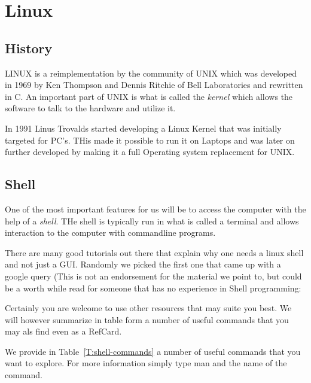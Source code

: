 

\chapter{Linux}
\label{C:linux}

\FILENAME

\section{History}

LINUX is a reimplementation by the community of UNIX which was
developed in 1969 by Ken Thompson and Dennis Ritchie of Bell
Laboratories and rewritten in C. An important part of UNIX is what is
called the \textit{kernel} which allows the software to talk to
the hardware and utilize it. 

In 1991 Linus Trovalds started developing a Linux Kernel that was
initially targeted for PC's. THis made it possible to run it on
Laptops and was later on further developed by making it a full
Operating system replacement for UNIX. 

\section{Shell}

One of the most important features for us will be to access the
computer with the help of a \textit{shell}. THe shell is typically run in
what is called a terminal and allows interaction to the computer with
commandline programs. 

There are many good tutorials out there that explain why one needs a
linux shell and not just a GUI. Randomly we picked the first one that
came up with a google query (This is not an endorsement for the material
we point to, but could be a worth while read for someone that has no
experience in Shell programming:


Certainly you are welcome to use other resources that may suite you
best. We will however summarize in table form a number of useful
commands that you may als find even as a RefCard.


We provide in Table~\ref{T:shell-commands} a number of useful commands
that you want to explore. For more information simply type man and the
name of the command.



